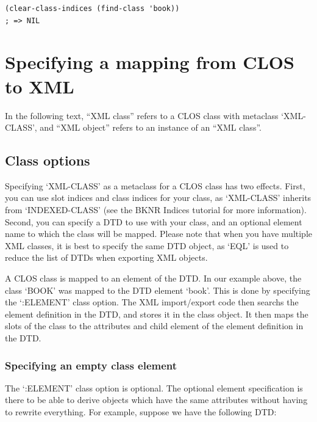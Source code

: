 \begin{Verbatim}[fontsize=\small,frame=leftline,framerule=0.9mm,rulecolor=\color{gray},framesep=5.1mm,xleftmargin=5mm,fontfamily=cmtt]
(clear-class-indices (find-class 'book))
; => NIL
\end{Verbatim}


\section{ Specifying a mapping from CLOS to XML}

In the following text, ``XML class'' refers to a CLOS class with
metaclass `XML-CLASS', and ``XML object'' refers to an instance of
an ``XML class''.



\subsection{ Class options}

Specifying `XML-CLASS' as a metaclass for a CLOS class has two
effects. First, you can use slot indices and class indices for
your class, as `XML-CLASS' inherits from `INDEXED-CLASS' (see the
BKNR Indices tutorial for more information). Second, you can
specify a DTD to use with your class, and an optional element name
to which the class will be mapped. Please note that when
you have multiple XML classes, it is best to specify the same DTD
object, as `EQL' is used to reduce the list of DTDs when exporting
XML objects.

A CLOS class is mapped to an element of the DTD. In our example
above, the class `BOOK' was mapped to the DTD element `book'. This
is done by specifying the `:ELEMENT' class option. The XML
import/export code then searchs the element definition in the DTD,
and stores it in the class object. It then maps the slots of the
class to the attributes and child element of the element
definition in the DTD.



\subsubsection{ Specifying an empty class element}

The `:ELEMENT' class option is optional. The optional element
specification is there to be able to derive objects which have the
same attributes without having to rewrite everything. For example,
suppose we have the following DTD:

